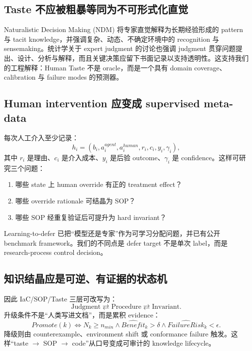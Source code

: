 \documentclass[11pt,a4paper]{ctexart}
\begin{document}
\subsection{Taste 不应被粗暴等同为不可形式化直觉}

Naturalistic Decision Making (NDM) 将专家直觉解释为长期经验形成的 pattern 与 tacit knowledge，并强调复杂、动态、不确定环境中的 recognition 与 sensemaking\cite{klein2015intuition,patterson2010tacit}。统计学关于 expert judgment 的讨论也强调 judgment 贯穿问题提出、设计、分析与解释，而且关键决策应留下书面记录以支持透明性\cite{brownstein2019judgment}。这支持我们的工程解释：Human Taste 不是 oracle，而是一个具有 domain coverage、calibration 与 failure modes 的预测器。

\subsection{Human intervention 应变成 supervised meta-data}

每次人工介入至少记录：
\begin{equation}
 h_i=(b_i,a_i^{agent},a_i^{human},r_i,c_i,y_i,\gamma_i),
\end{equation}
其中 $r_i$ 是理由、$c_i$ 是介入成本、$y_i$ 是后验 outcome、$\gamma_i$ 是 confidence。这样可研究三个问题：
\begin{enumerate}
 \item 哪些 state 上 human override 有正的 treatment effect？
 \item 哪些 override rationale 可结晶为 SOP？
 \item 哪些 SOP 经重复验证后可提升为 hard invariant？
\end{enumerate}
Learning-to-defer 已把“模型还是专家”作为可学习分配问题，并已有公开 benchmark framework\cite{alves2025defer}。我们的不同点是 defer target 不是单次 label，而是 research-process control decision。

\subsection{知识结晶应是可逆、有证据的状态机}

因此 IaC/SOP/Taste 三层可改写为：
\begin{equation}
\text{Judgment}\rightleftarrows\text{Procedure}\rightleftarrows\text{Invariant}.
\end{equation}
升级条件不是“人类写进文档”，而是累积 evidence：
\begin{equation}
Promote(k)\iff
N_k\ge n_{min}\land
\widehat{Benefit}_k>\delta\land
\widehat{FailureRisk}_k<\epsilon.
\end{equation}
降级则由 counterexample、environment shift 或 conformance failure 触发。这样“taste $\to$ SOP $\to$ code”从口号变成可审计的 knowledge lifecycle。
\end{document}
